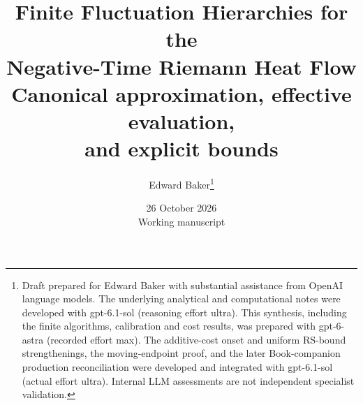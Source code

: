 \documentclass[11pt]{article}
\title{Finite Fluctuation Hierarchies for the\\Negative-Time Riemann Heat Flow\\[0.5em]
\large Canonical approximation, effective evaluation,\\
and explicit bounds}
\author{Edward Baker\thanks{Draft prepared for Edward Baker with substantial assistance from OpenAI language models. The underlying analytical and computational notes were developed with gpt-6.1-sol (reasoning effort ultra). This synthesis, including the finite algorithms, calibration and cost results, was prepared with gpt-6-astra (recorded effort max). The additive-cost onset and uniform RS-bound strengthenings, the moving-endpoint proof, and the later Book-companion production reconciliation were developed and integrated with gpt-6.1-sol (actual effort ultra). Internal LLM assessments are not independent specialist validation.}}
\date{26 October 2026\\\small Working manuscript}
\numberwithin{equation}{section}
\theoremstyle{definition}
\theoremstyle{remark}
\begin{document}
\maketitle

\clearpage
\begingroup
\small
\tableofcontents
\endgroup
\clearpage












\appendix



\end{document}
